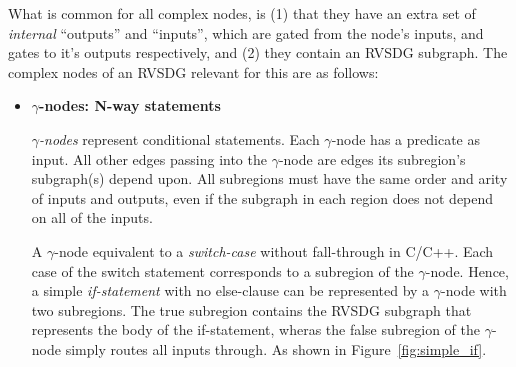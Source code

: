 What is common for all complex nodes, is (1) that they have an extra set of
\textit{internal} ``outputs'' and ``inputs'', which are gated from the node's
inputs, and gates to it's outputs respectively, and (2) they contain an RVSDG
subgraph. The complex nodes of an RVSDG relevant for this are as follows:

\begin{itemize}

\item \textbf{$\gamma$-nodes: N-way statements}

\textit{$\gamma$-nodes} represent conditional statements. Each $\gamma$-node has
a predicate as input. All other edges passing into the $\gamma$-node are edges
its subregion's subgraph(s) depend upon. All subregions must have the same
order and arity of inputs and outputs, even if the subgraph in each region does
not depend on all of the inputs.

A $\gamma$-node equivalent to a \textit{switch-case} without fall-through in
C/C++. Each case of the switch statement corresponds to a subregion of the
$\gamma$-node. Hence, a simple \textit{if-statement} with no else-clause can be
represented by a $\gamma$-node with two subregions. The true subregion contains
the RVSDG subgraph that represents the body of the if-statement, wheras the
false subregion of the $\gamma$-node simply routes all inputs through. As shown
in Figure~\ref{fig:simple_if}.



\end{itemize}

